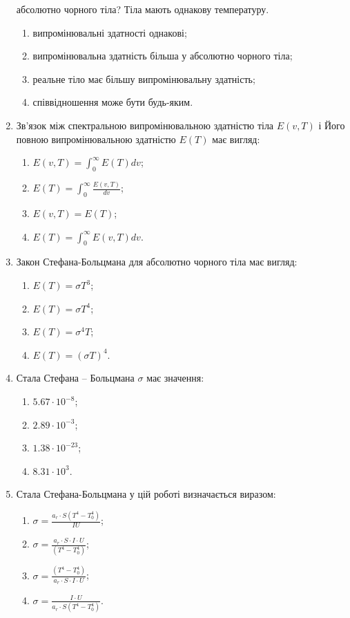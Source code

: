 \documentclass[twocolumn]{el-author}
\begin{document}
\begin{enumerate}
абсолютно чорного тіла? Тіла мають однакову температуру.
	\begin{enumerate}
		\item випромінювальні здатності однакові;
		\item випромінювальна здатність більша у абсолютно чорного тіла;
		\item реальне тіло має більшу випромінювальну здатність;
		\item співвідношення може бути будь-яким.
	\end{enumerate}
	\item Зв'язок між спектральною випромінювальною здатністю тіла $E(v, T)$ і Його
повною випромінювальною здатністю $E(T)$ має вигляд:
	\begin{enumerate}
		\item $E(v,T) = \int_{0}^{\infty}E(T)dv$;
		\item $E(T) =   \int_{0}^{\infty}\frac{E(v,T)}{dv}$;
		\item $E(v,T) = E(T)$;
		\item $E(T) =   \int_{0}^{\infty}E(v,T)dv$.
	\end{enumerate}
	\item Закон Стефана-Больцмана для абсолютно чорного тіла має вигляд:
	\begin{enumerate}
		\item $E(T) = \sigma T^{3}$;
		\item $E(T) = \sigma T^{4}$;
		\item $E(T) = \sigma ^{4} T$;
		\item $E(T) = (\sigma T)^{4}$.
	\end{enumerate}
	\item Стала Стефана -- Больцмана $\sigma$ має значення:
	\begin{enumerate}
		\item $5.67 \cdot 10^{-8}$;
		\item $2.89 \cdot 10^{-3}$;
		\item $1.38 \cdot 10^{-23}$;
		\item $8.31 \cdot 10^{3}$.
	\end{enumerate}
	\newpage
	\item Стала Стефана-Больцмана у цій роботі визначається виразом:
	\begin{enumerate}
		\item $\sigma = \frac{a_{r} \cdot S(T^{4} - T_{0}^{4})}{IU}$;
		\item $\sigma = \frac{a_{r} \cdot S \cdot I \cdot U}{(T^{4} - T_{0}^{4})}$;
		\item $\sigma = \frac{(T^{4} - T_{0}^{4})}{a_{r} \cdot S \cdot I \cdot U}$;
		\item $\sigma = \frac{I \cdot U}{a_{r} \cdot S(T^{4} -  T_{0}^{4})}$.
	\end{enumerate}
\end{enumerate}
\end{document}
